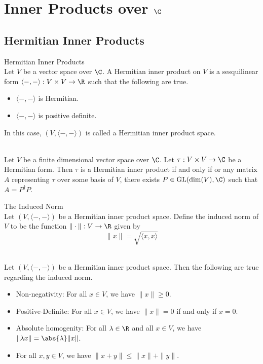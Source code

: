 \documentclass[a4paper]{article}
\begin{document}
\pagebreak
\section{Inner Products over $\C$}
\subsection{Hermitian Inner Products}
\begin{defn}{Hermitian Inner Products}{}\\
Let $V$ be a vector space over $\C$. A Hermitian inner product on $V$ is a sesquilinear form $\langle-,-\rangle:V\times V\to\R$ such that the following are true. 
\begin{itemize}
\item $\langle-,-\rangle$ is Hermitian. 
\item $\langle-,-\rangle$ is positive definite. 
\end{itemize}
In this case, $(V,\langle-,-\rangle)$ is called a Hermitian inner product space. 
\end{defn}

\begin{prp}{}{}\\
Let $V$ be a finite dimensional vector space over $\C$. Let $\tau:V\times V\to\C$ be a Hermitian form. Then $\tau$ is a Hermitian inner product if and only if or any matrix $A$ representing $\tau$ over some basis of $V$, there exists $P\in\text{GL}(\dim(V),\C)$ such that $A=P^\dagger P$. 
\end{prp}

\begin{defn}{The Induced Norm}{}\\
Let $(V,\langle-,-\rangle)$ be a Hermitian inner product space. Define the induced norm of $V$ to be the function $\|\cdot\|:V\to\R$ given by $$\|x\|=\sqrt{\langle x,x\rangle}$$
\end{defn}

\begin{prp}{}{}\\
Let $(V,\langle-,-\rangle)$ be a Hermitian inner product space. Then the following are true regarding the induced norm. 
\begin{itemize}
\item Non-negativity: For all $x\in V$, we have $\|x\|\geq 0$. 
\item Positive-Definite: For all $x\in V$, we have $\|x\|=0$ if and only if $x=0$. 
\item Absolute homogenity: For all $\lambda\in\R$ and all $x\in V$, we have $\|\lambda x\|=\abs{\lambda}\|x\|$. 
\item For all $x,y\in V$, we have $\|x+y\|\leq\|x\|+\|y\|$. 
\end{itemize}
\end{prp}
\end{document}
